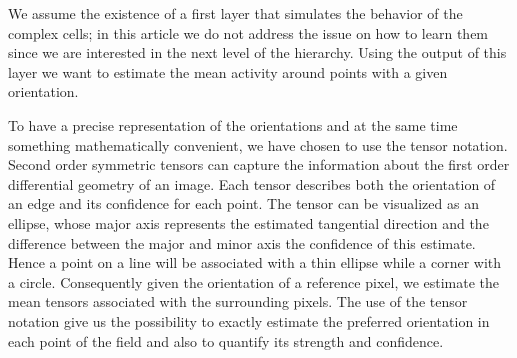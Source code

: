 \documentclass{llncs}
\makeatletter
\DeclareRobustCommand\onedot{\futurelet\@let@token\@onedot}
\def\@onedot{\ifx\@let@token.\else.\null\fi\xspace}
\def\etal{\emph{et al}\onedot}
\makeatother
\begin{document}





We assume the existence of a first layer that
simulates the behavior of the complex cells; in this
article we do not address the issue on how to learn
them since we are interested in the next level of the hierarchy.
Using the output of this layer we want to estimate the mean
activity around points with a given orientation.

To have a precise representation of the orientations and at the same time
something mathematically convenient, we have chosen to use the tensor notation.
Second order symmetric tensors can capture the information about the first
order differential geometry of an image. Each tensor describes both the
orientation of an edge and its confidence for each point. The tensor can be
visualized as an ellipse, whose major axis represents the estimated tangential
direction and the difference between the major and minor axis the confidence
of this estimate. Hence a point on a line will be associated with a thin
ellipse while a corner with a circle.
Consequently given the orientation of a reference pixel, we estimate the mean
tensors associated with the surrounding pixels. The use of the tensor notation
give us the possibility to exactly estimate the preferred orientation in each
point of the field and also to quantify its strength and confidence.
\end{document}
